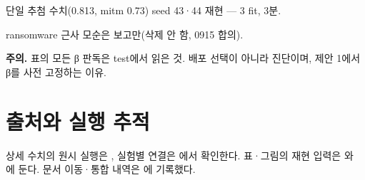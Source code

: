 \par\noindent \textbullet\enspace 단일 추첨 수치(0.813, mitm 0.73) seed 43·44 재현 — 3 fit, 3분.


\par\noindent \textbullet\enspace ransomware 근사 모순은 보고만(삭제 안 함, 0915 합의).


\textbf{주의.} 표의 모든 β 판독은 test에서 읽은 것. 배포 선택이 아니라 진단이며, 제안 1에서 β를 사전 고정하는 이유.



\section*{출처와 실행 추적}

상세 수치의 원시 실행은 , 실험별 연결은 에서 확인한다. 표·그림의 재현 입력은 와 에 둔다. 문서 이동·통합 내역은 에 기록했다.


